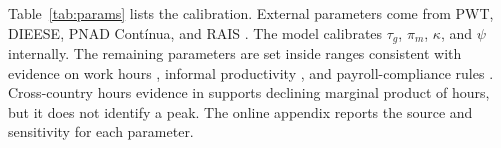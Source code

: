 
Table~\ref{tab:params} lists the calibration. External parameters come from PWT, DIEESE, PNAD Cont\'{i}nua, and RAIS \citep{PNAD2025,RAIS2022,DIEESE2024,PWT2025}. The model calibrates $\tau_g$, $\pi_m$, $\kappa$, and $\psi$ internally. The remaining parameters are set inside ranges consistent with evidence on work hours \citep{Pencavel2015,CollewetSauermann2017}, informal productivity \citep{LaPortaShleifer2014}, and payroll-compliance rules \citep{BrasilLei8212,ReceitaESocialRural2021}. Cross-country hours evidence in \citet{BickFuchsSchundelnLagakos2018} supports declining marginal product of hours, but it does not identify a peak. The online appendix reports the source and sensitivity for each parameter.

